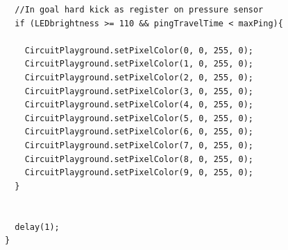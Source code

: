 \documentclass[12pt]{article}
\begin{document}
\begin{verbatim}
  //In goal hard kick as register on pressure sensor
  if (LEDbrightness >= 110 && pingTravelTime < maxPing){
  
    CircuitPlayground.setPixelColor(0, 0, 255, 0);
    CircuitPlayground.setPixelColor(1, 0, 255, 0);
    CircuitPlayground.setPixelColor(2, 0, 255, 0);
    CircuitPlayground.setPixelColor(3, 0, 255, 0);
    CircuitPlayground.setPixelColor(4, 0, 255, 0);
    CircuitPlayground.setPixelColor(5, 0, 255, 0);
    CircuitPlayground.setPixelColor(6, 0, 255, 0);
    CircuitPlayground.setPixelColor(7, 0, 255, 0);
    CircuitPlayground.setPixelColor(8, 0, 255, 0);
    CircuitPlayground.setPixelColor(9, 0, 255, 0);
  }

  
  delay(1);
}
\end{verbatim}

\end{document}
